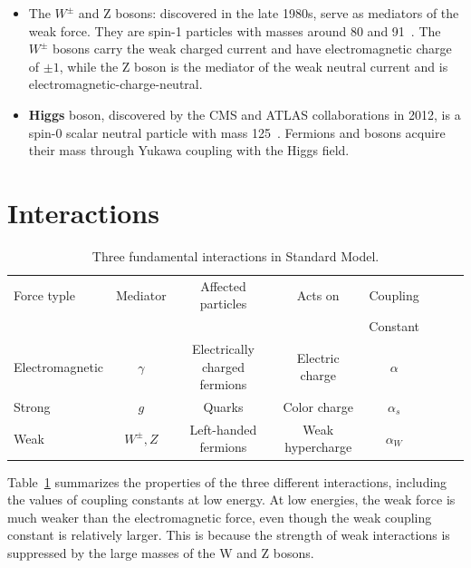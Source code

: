 \begin{itemize}
\begin{itemize}
  \item The $W^{\pm}$ and Z bosons: discovered in the late 1980s, serve as mediators of the weak force. They are spin-1 particles with masses around 80 and 91~\GeV. The \textbf{$W^{\pm}$} bosons carry the weak charged current and have electromagnetic charge of $\pm 1$, while the Z boson is the mediator of the weak neutral current and is electromagnetic-charge-neutral. 
    \item \textbf{Higgs} boson, discovered by the CMS and ATLAS collaborations in 2012\cite{Aad:2012tfa}\cite{Chatrchyan:2012xdj}, is a spin-0 scalar neutral particle with mass 125~\GeV. Fermions and bosons acquire their mass through Yukawa coupling with the Higgs field. 
\end{itemize}
\end{itemize}
 
 

\section{Interactions}
\begin{table}[tbh]
\centering
\tiny
\begin{tabular}{|l|c|c|c|c|c|c|c}

\hline
    Force typle & Mediator & Affected particles & Acts on & Coupling\\
    &&&&Constant\\ 
    \hline
\hline
    Electromagnetic & $\gamma$&Electrically charged fermions&Electric charge& $\alpha$ \\
    Strong  & $g$ &Quarks & Color charge& $\alpha_s$ \\
    Weak & $W^{\pm}, Z$ &Left-handed fermions & Weak hypercharge& $\alpha_W$ \\
\hline
\end{tabular}
\caption{Three fundamental interactions in Standard Model. }
\label{tab:forces}
\end{table}

\par Table~\ref{tab:forces} summarizes the properties of the three different interactions, including the values of coupling constants at low energy. 
At low energies, the weak force is much weaker than the electromagnetic force, even though the weak coupling constant is relatively larger. 
This is because the strength of weak interactions is suppressed by the large masses of the W and Z bosons. 

